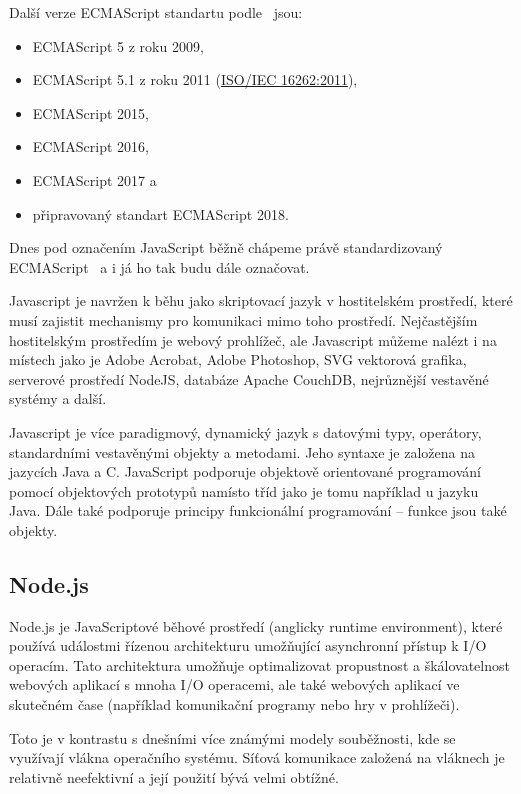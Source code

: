 Další verze ECMAScript standartu podle~\cite{mozzila:javascriptVersions} jsou:
\begin{itemize}
    \item ECMAScript 5 z roku 2009,
    \item ECMAScript 5.1 z roku 2011 (\href{http://www.iso.org/iso/iso_catalogue/catalogue_tc/catalogue_detail.htm?csnumber=55755}{ISO/IEC 16262:2011}),
    \item ECMAScript 2015,
    \item ECMAScript 2016,
    \item ECMAScript 2017 a
    \item připravovaný standart ECMAScript 2018.
\end{itemize}

Dnes pod označením JavaScript běžně chápeme právě standardizovaný ECMAScript~\cite{mozzila:javascript} a i já ho tak budu dále označovat.

Javascript je navržen k běhu jako skriptovací jazyk v hostitelském prostředí, které musí zajistit mechanismy pro komunikaci mimo toho prostředí.
Nejčastějším hostitelským prostředím je webový prohlížeč, ale Javascript můžeme nalézt i na místech jako je Adobe Acrobat, Adobe Photoshop, SVG vektorová grafika, serverové prostředí NodeJS, databáze Apache CouchDB, nejrůznější vestavěné systémy a další.~\cite{mozzila:javascript}

Javascript je více paradigmový, dynamický jazyk s datovými typy, operátory, standardními vestavěnými objekty a metodami.
Jeho syntaxe je založena na jazycích Java a C.
JavaScript podporuje objektově orientované programování pomocí objektových prototypů namísto tříd jako je tomu například u jazyku Java.
Dále také podporuje principy funkcionální programování -- funkce jsou také objekty.~\cite{mozzila:javascript}

\subsection{Node.js}\label{subsec:nodejs}

Node.js je JavaScriptové běhové prostředí (anglicky runtime environment), které používá událostmi řízenou architekturu umožňující asynchronní přístup k \gls{I/O} operacím.
Tato architektura umožňuje optimalizovat propustnost a škálovatelnost webových aplikací s mnoha \gls{I/O} operacemi, ale také webových aplikací ve skutečném čase (například komunikační programy nebo hry v prohlížeči).~\cite{node:article2013}

Toto je v kontrastu s dnešními více známými modely souběžnosti, kde se využívají vlákna operačního systému.
Síťová komunikace založená na vláknech je relativně neefektivní a její použití bývá velmi obtížné.~\cite{node:about}

